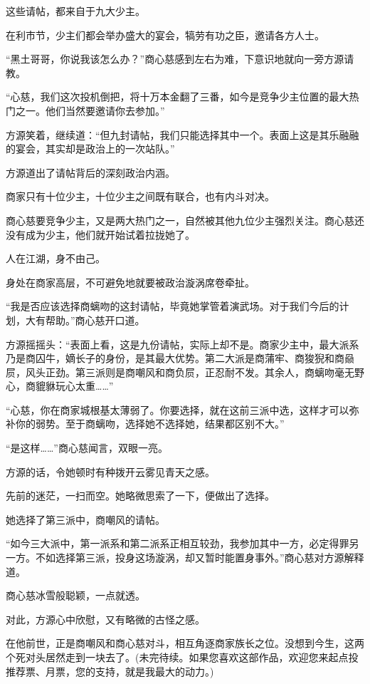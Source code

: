 \begin{this_body}
这些请帖，都来自于九大少主。

在利市节，少主们都会举办盛大的宴会，犒劳有功之臣，邀请各方人士。

“黑土哥哥，你说我该怎么办？”商心慈感到左右为难，下意识地就向一旁方源请教。

“心慈，我们这次投机倒把，将十万本金翻了三番，如今是竞争少主位置的最大热门之一。他们当然要邀请你去参加。”

方源笑着，继续道：“但九封请帖，我们只能选择其中一个。表面上这是其乐融融的宴会，其实却是政治上的一次站队。”

方源道出了请帖背后的深刻政治内涵。

商家只有十位少主，十位少主之间既有联合，也有内斗对决。

商心慈要竞争少主，又是两大热门之一，自然被其他九位少主强烈关注。商心慈还没有成为少主，他们就开始试着拉拢她了。

人在江湖，身不由己。

身处在商家高层，不可避免地就要被政治漩涡席卷牵扯。

“我是否应该选择商螭吻的这封请帖，毕竟她掌管着演武场。对于我们今后的计划，大有帮助。”商心慈开口道。

方源摇摇头：“表面上看，这是九份请帖，实际上却不是。商家少主中，最大派系乃是商囚牛，嫡长子的身份，是其最大优势。第二大派是商蒲牢、商狻猊和商赑屃，风头正劲。第三派则是商嘲风和商负屃，正忍耐不发。其余人，商螭吻毫无野心，商貔貅玩心太重……”

“心慈，你在商家城根基太薄弱了。你要选择，就在这前三派中选，这样才可以弥补你的弱势。至于商螭吻，选择她不选择她，结果都区别不大。”

“是这样……”商心慈闻言，双眼一亮。

方源的话，令她顿时有种拨开云雾见青天之感。

先前的迷茫，一扫而空。她略微思索了一下，便做出了选择。

她选择了第三派中，商嘲风的请帖。

“如今三大派中，第一派系和第二派系正相互较劲，我参加其中一方，必定得罪另一方。不如选择第三派，投身这场漩涡，却又暂时能置身事外。”商心慈对方源解释道。

商心慈冰雪般聪颖，一点就透。

对此，方源心中欣慰，又有略微的古怪之感。

在他前世，正是商嘲风和商心慈对斗，相互角逐商家族长之位。没想到今生，这两个死对头居然走到一块去了。(未完待续。如果您喜欢这部作品，欢迎您来起点投推荐票、月票，您的支持，就是我最大的动力。)

\end{this_body}

